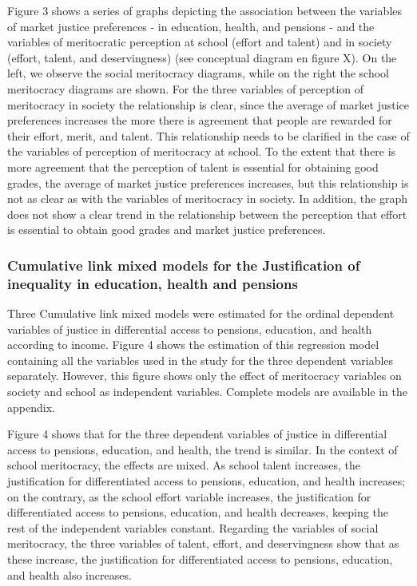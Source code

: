 \documentclass[
  letterpaper,
  DIV=11,
  numbers=noendperiod]{scrartcl}
\begin{document}
Figure 3 shows a series of graphs depicting the association between the
variables of market justice preferences - in education, health, and
pensions - and the variables of meritocratic perception at school
(effort and talent) and in society (effort, talent, and deservingness)
(see conceptual diagram en figure X). On the left, we observe the social
meritocracy diagrams, while on the right the school meritocracy diagrams
are shown. For the three variables of perception of meritocracy in
society the relationship is clear, since the average of market justice
preferences increases the more there is agreement that people are
rewarded for their effort, merit, and talent. This relationship needs to
be clarified in the case of the variables of perception of meritocracy
at school. To the extent that there is more agreement that the
perception of talent is essential for obtaining good grades, the average
of market justice preferences increases, but this relationship is not as
clear as with the variables of meritocracy in society. In addition, the
graph does not show a clear trend in the relationship between the
perception that effort is essential to obtain good grades and market
justice preferences.

\subsubsection{Cumulative link mixed models for the Justification of
inequality in education, health and
pensions}\label{cumulative-link-mixed-models-for-the-justification-of-inequality-in-education-health-and-pensions}

Three Cumulative link mixed models were estimated for the ordinal
dependent variables of justice in differential access to pensions,
education, and health according to income. Figure 4 shows the estimation
of this regression model containing all the variables used in the study
for the three dependent variables separately. However, this figure shows
only the effect of meritocracy variables on society and school as
independent variables. Complete models are available in the appendix.

Figure 4 shows that for the three dependent variables of justice in
differential access to pensions, education, and health, the trend is
similar. In the context of school meritocracy, the effects are mixed. As
school talent increases, the justification for differentiated access to
pensions, education, and health increases; on the contrary, as the
school effort variable increases, the justification for differentiated
access to pensions, education, and health decreases, keeping the rest of
the independent variables constant. Regarding the variables of social
meritocracy, the three variables of talent, effort, and deservingness
show that as these increase, the justification for differentiated access
to pensions, education, and health also increases.
\end{document}
